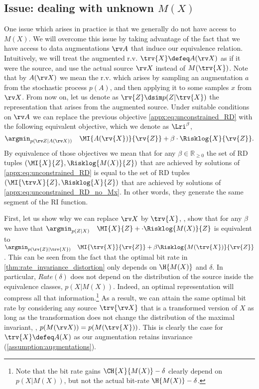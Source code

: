 \documentclass[final]{article}
\begin{document}
\subsection{Issue: dealing with unknown \texorpdfstring{$M(X)$}{M(X)}}
\label{appx:unkown_M}

One issue which arises in practice is that we generally do not have access to $M(X)$.
We will overcome this issue by taking advantage of the fact that we have access to data augmentations $\rv A$  that induce our equivalence relation.
Intuitively, we will treat the augmented r.v. $\trv{X} \defeq A(\rv X)$ as if it were the source, and use the actual source $\rv X$ instead of $M(\trv{X})$.
Note that by $A(\rv X)$ we mean the r.v. which arises by sampling an augmentation $a$ from the stochastic process $p(A)$, and then applying it to some samples $x$ from $\rv X$.
From now on, let us denote as $\rv{Z} \dsim p(Z|\trv{X})$ the representation that arises from the augmented source.
Under suitable conditions on $\rv A$ we can replace the previous objective \cref{appx:eq:unconstrained_RD} with the following equivalent objective, which we denote as $\Lri^\beta$, 
\begin{equation}\label{appx:eq:unconstrained_RD_no_Mx}
\argmin_{p(\rv Z | A(\rv X) )}  \quad  \MI{A(\rv{X})}{\rv{Z}} + \beta \cdot \Risklog{X}{\rv{Z}}.
\end{equation}
By equivalence of those objectives we mean that for any $\beta \in \mathbb{R}_{\geq 0}$ the set of RD tuples $(\MI{X}{ Z},\Risklog{M(X)}{Z})$ that are achieved by solutions of \cref{appx:eq:unconstrained_RD}  is equal to the set of RD tuples $(\MI{\trv X}{ Z},\Risklog{X}{Z})$ that are achieved by solutions of \cref{appx:eq:unconstrained_RD_no_Mx}.
In other words, they generate the same segment of the RI function.

First, let us show why we can replace $\rv X$ by $\trv{  X}$, \ie, show that for any $\beta$  we have that $\argmin_{p(Z| X)}  \quad  \MI{X}{ Z} + \cdot \Risklog{M(X)}{Z}$ is equivalent to $\argmin_{p(\rv{Z}| \trv{X})}  \quad  \MI{\trv{X}}{ \rv{Z}} + \beta \Risklog{M(\trv{X})}{\rv{Z}}$.
This can be seen from the fact that the optimal bit rate in \cref{thm:rate_invariance_distortion} only depends on $\H{M(X)}$ and $\delta$.
In particular, $Rate(\delta)$ does not depend on the distribution of the source inside the equivalence classes, $p(X|M(X))$.
Indeed, an optimal representation will compress all that information.\footnote{Note that the bit rate gains $\CH{X}{M(X)} - \delta$ clearly depend on $p(X|M(X))$, but not the actual bit-rate $\H{M(X)} - \delta$.}
As a result, we can attain the same optimal bit rate by considering any source $\trv{\rv X}$ that is a transformed version of $X$ as long as the transformation does not change the distribution of the maximal invariant, \ie, $p(M(\rv X))=p(M(\trv{ X}))$.
This is clearly the case for $\trv{X} \defeq A(X)$ as our augmentation retains invariance (\cref{assumption:augmentations}).
\end{document}

